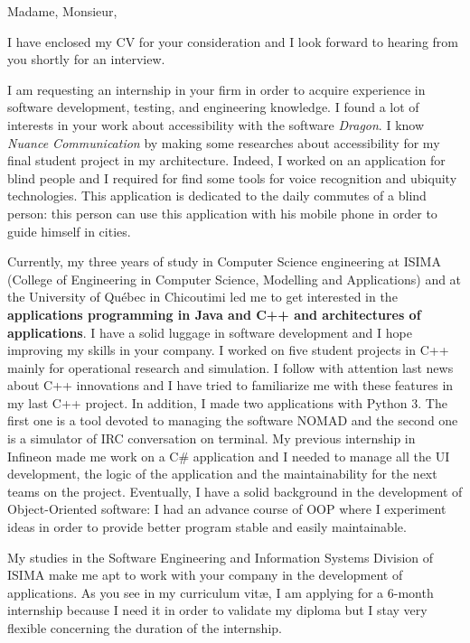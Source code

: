 
\date{\today}
\opening{Madame, Monsieur,}
\closing{I have enclosed my CV for your consideration and I look forward to hearing from you shortly for an interview.}

\makelettertitle

I am requesting an internship in your firm in order to acquire experience in software development, testing, and engineering knowledge. I found a lot of interests in your work about accessibility with the software \textit{Dragon}. I know \textit{Nuance Communication} by making some researches about accessibility for my final student project in my architecture. Indeed, I worked on an application for blind people and I required for find some tools for voice recognition and ubiquity technologies. This application is dedicated to the daily commutes of a blind person: this person can use this application with his mobile phone in order to guide himself in cities.

Currently, my three years of study in Computer Science engineering at ISIMA (College of Engineering in Computer Science, Modelling and Applications) and at the University of Québec in Chicoutimi led me to get interested in the \textbf{applications programming in Java and C++ and architectures of applications}. I have a solid luggage in software development and I hope improving my skills in your company. I worked on five student projects in C++ mainly for operational research and simulation. I follow with attention last news about C++ innovations and I have tried to familiarize me with these features in my last C++ project. In addition, I made two applications with Python 3. The first one is a tool devoted to managing the software NOMAD and the second one is a simulator of IRC conversation on terminal. My previous internship in Infineon made me work on a C\# application and I needed to manage all the UI development, the logic of the application and the maintainability for the next teams on the project. Eventually, I have a solid background in the development of Object-Oriented software: I had an advance course of OOP where I experiment ideas in order to provide better program stable and easily maintainable.

My studies in the Software Engineering and Information Systems Division of ISIMA make me apt to work with your company in the development of applications. As you see in my curriculum vit\ae{}, I am applying for a 6-month internship because I need it in order to validate my diploma but I stay very flexible concerning the duration of the internship.

\makeletterclosing
